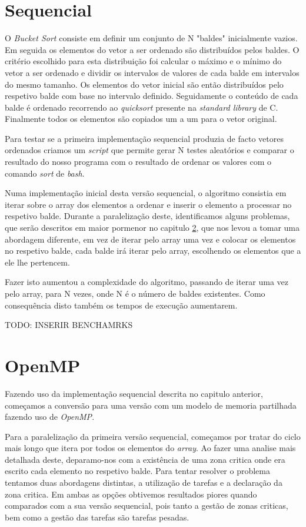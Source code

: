 \documentclass[a4paper]{report}
\begin{document}
\chapter{Sequencial}
O \textit{Bucket Sort} consiste em definir um conjunto de N "baldes"
inicialmente vazios. Em seguida os elementos do vetor a ser ordenado são
distribuídos pelos baldes. O critério escolhido para esta distribuição foi
calcular o máximo e o mínimo do vetor a ser ordenado e dividir os intervalos de
valores de cada balde em intervalos do mesmo tamanho. Os elementos do vetor
inicial são então distribuídos pelo respetivo balde com base no intervalo
definido. Seguidamente o conteúdo de cada balde é ordenado recorrendo ao
\textit{quicksort} presente na \textit{standard library} de C. Finalmente todos
os elementos são copiados um a um para o vetor original.

Para testar se a primeira implementação sequencial produzia de facto vetores
ordenados criamos um \textit{script} que permite gerar N testes aleatórios e
comparar o resultado do nosso programa com o resultado de ordenar os valores
com o comando \textit{sort} de \textit{bash}.

Numa implementação inicial desta versão sequencial, o algoritmo consistia em
iterar sobre o array dos elementos a ordenar e inserir o elemento a processar no
respetivo balde. Durante a paralelização deste, identificamos alguns problemas,
que serão descritos em maior pormenor no capitulo \ref{chap:omp}, que nos levou
a tomar uma abordagem diferente, em vez de iterar pelo array uma vez e colocar
os elementos no respetivo balde, cada balde irá iterar pelo array, escolhendo os
elementos que a ele lhe pertencem.

Fazer isto aumentou a complexidade do algoritmo, passando de iterar uma vez pelo
array, para N vezes, onde N é o número de baldes existentes. Como
consequência disto
também os tempos de execução aumentarem.

TODO: INSERIR BENCHAMRKS

\chapter{OpenMP} \label{chap:omp}
Fazendo uso da implementação sequencial descrita no capitulo anterior, começamos
a conversão para uma versão com um modelo de memoria partilhada fazendo uso de
\textit{OpenMP}.

Para a paralelização da primeira versão sequencial, começamos por tratar do
ciclo mais longo que itera por todos os elementos do \textit{array}. Ao fazer
uma analise mais detalhada deste, deparamo-nos com a existência de uma zona
critica onde era escrito cada elemento no respetivo balde. Para tentar resolver
o problema tentamos duas abordagens distintas, a utilização de tarefas e a
declaração da zona critica. Em ambas as opções obtivemos resultados piores
quando comparados com a sua versão sequencial, pois tanto a gestão de zonas
criticas, bem como a gestão das tarefas são tarefas pesadas.
\end{document}
